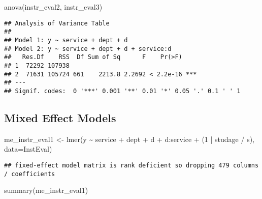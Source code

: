 \documentclass[
]{article}
\newenvironment{Shaded}{\begin{snugshade}}{\end{snugshade}}
\newcommand{\AttributeTok}[1]{\textcolor[rgb]{0.77,0.63,0.00}{#1}}
\newcommand{\DecValTok}[1]{\textcolor[rgb]{0.00,0.00,0.81}{#1}}
\newcommand{\FunctionTok}[1]{\textcolor[rgb]{0.00,0.00,0.00}{#1}}
\newcommand{\NormalTok}[1]{#1}
\newcommand{\OtherTok}[1]{\textcolor[rgb]{0.56,0.35,0.01}{#1}}
\newcommand{\SpecialCharTok}[1]{\textcolor[rgb]{0.00,0.00,0.00}{#1}}
\begin{document}
\begin{Shaded}
\begin{Highlighting}[]
\FunctionTok{anova}\NormalTok{(instr\_eval2, instr\_eval3)}
\end{Highlighting}
\end{Shaded}

\begin{verbatim}
## Analysis of Variance Table
## 
## Model 1: y ~ service + dept + d
## Model 2: y ~ service + dept + d + service:d
##   Res.Df    RSS  Df Sum of Sq      F    Pr(>F)    
## 1  72292 107938                                   
## 2  71631 105724 661    2213.8 2.2692 < 2.2e-16 ***
## ---
## Signif. codes:  0 '***' 0.001 '**' 0.01 '*' 0.05 '.' 0.1 ' ' 1
\end{verbatim}

\hypertarget{mixed-effect-models}{%
\subsection{Mixed Effect Models}\label{mixed-effect-models}}

\begin{Shaded}
\begin{Highlighting}[]
\NormalTok{me\_instr\_eval1 }\OtherTok{\textless{}{-}} \FunctionTok{lmer}\NormalTok{(y }\SpecialCharTok{\textasciitilde{}}\NormalTok{ service }\SpecialCharTok{+}\NormalTok{ dept }\SpecialCharTok{+}\NormalTok{ d }\SpecialCharTok{+}\NormalTok{ d}\SpecialCharTok{:}\NormalTok{service }\SpecialCharTok{+}\NormalTok{ (}\DecValTok{1} \SpecialCharTok{|}\NormalTok{ studage }\SpecialCharTok{/}\NormalTok{ s), }\AttributeTok{data=}\NormalTok{InstEval)}
\end{Highlighting}
\end{Shaded}

\begin{verbatim}
## fixed-effect model matrix is rank deficient so dropping 479 columns / coefficients
\end{verbatim}

\begin{Shaded}
\begin{Highlighting}[]
\FunctionTok{summary}\NormalTok{(me\_instr\_eval1)}
\end{Highlighting}
\end{Shaded}
\end{document}
